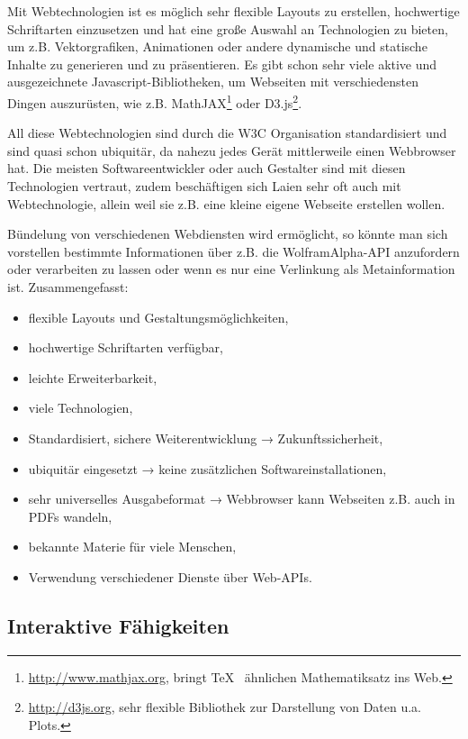 Mit Webtechnologien ist es möglich sehr flexible Layouts zu erstellen,
hochwertige Schriftarten einzusetzen und hat eine große Auswahl an
Technologien zu bieten, um z.B. Vektorgrafiken, Animationen oder
andere dynamische und statische Inhalte zu generieren und zu
präsentieren. Es gibt schon sehr viele aktive und ausgezeichnete
Javascript-Bibliotheken,
um Webseiten mit verschiedensten Dingen auszurüsten,
wie z.B. MathJAX\footnote{\url{http://www.mathjax.org}, bringt \TeX~ ähnlichen
Mathematiksatz ins Web.} oder
D3.js\footnote{\url{http://d3js.org}, sehr flexible Bibliothek zur Darstellung
von Daten u.a. Plots.}.

All diese Webtechnologien sind durch die W3C Organisation standardisiert
und sind quasi schon ubiquitär, da nahezu jedes Gerät mittlerweile einen
Webbrowser hat. Die meisten Softwareentwickler oder auch
Gestalter sind mit diesen Technologien vertraut, zudem beschäftigen sich
Laien sehr oft auch mit Webtechnologie, allein weil sie z.B. eine kleine
eigene Webseite erstellen wollen.

Bündelung von verschiedenen Webdiensten wird ermöglicht, so könnte man sich
vorstellen bestimmte Informationen über z.B. die WolframAlpha-API
anzufordern oder verarbeiten zu lassen oder wenn es nur eine Verlinkung
als Metainformation ist. Zusammengefasst:

\begin{itemize}
  \item flexible Layouts und Gestaltungsmöglichkeiten,
  \item hochwertige Schriftarten verfügbar,
  \item leichte Erweiterbarkeit,
  \item viele Technologien,
  \item Standardisiert, sichere Weiterentwicklung → Zukunftssicherheit,
  \item ubiquitär eingesetzt → keine zusätzlichen Softwareinstallationen,
  \item sehr universelles Ausgabeformat → Webbrowser
        kann Webseiten z.B. auch in PDFs wandeln,
  \item bekannte Materie für viele Menschen,
  \item Verwendung verschiedener Dienste über Web-APIs.
\end{itemize}

\subsection{Interaktive Fähigkeiten}

